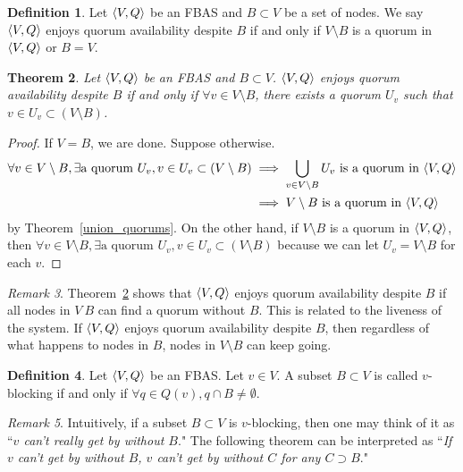 \documentclass[12pt, psamsfonts]{amsart}
\newtheorem{thm}{Theorem}[section]
\theoremstyle{definition}
\newtheorem{defn}[thm]{Definition}
\theoremstyle{remark}
\newtheorem{rem}[thm]{Remark}
\numberwithin{equation}{section}
\begin{document}
\begin{defn}\label{def_quorum_availability}
    Let $\ev{V, Q}$ be an FBAS and $B \subset V$ be a set of nodes.
    We say $\ev{V, Q}$ enjoys quorum availability despite $B$ if and only if $V \setminus B$ is a quorum in $\ev{V, Q}$ or $B = V$.
\end{defn}

\begin{thm}\label{quorum_availability_equivalence_condition}
    Let $\ev{V, Q}$ be an FBAS and $B \subset V$.
    $\ev{V, Q}$ enjoys quorum availability despite $B$ if and only if $\forall v \in V \setminus B$, there exists a quorum $U_v$ such that $v \in U_v \subset (V \setminus B)$.
\end{thm}

\begin{proof}
    If $V = B$, we are done.
    Suppose otherwise.
    \begin{align*}
        \forall v \in V \setminus B, \exists \text{a quorum $U_v$}, v \in U_v \subset (V \setminus B)
            &\implies \bigcup_{v \in V \setminus B} U_v \text{ is a quorum in $\ev{V, Q}$} \\
            &\implies \text{$V \setminus B$ is a quorum in $\ev{V, Q}$}
    \end{align*}
    by Theorem~\ref{union_quorums}.
    On the other hand, if $V \setminus B$ is a quorum in $\ev{V, Q}$, then $\forall v \in V \setminus B, \exists \text{a quorum $U_v$}, v \in U_v \subset (V \setminus B)$ because we can let $U_v = V \setminus B$ for each $v$.
\end{proof}

\begin{rem}
    Theorem~\ref{quorum_availability_equivalence_condition} shows that $\ev{V, Q}$ enjoys quorum availability despite $B$ if all nodes in $V \ B$ can find a quorum without $B$.
    This is related to the liveness of the system.
    If $\ev{V, Q}$ enjoys quorum availability despite $B$, then regardless of what happens to nodes in $B$, nodes in $V \setminus B$ can keep going.
\end{rem}

\begin{defn}\label{def_v_blocking}
    Let $\ev{V, Q}$ be an FBAS\@.
    Let $v \in V$.
    A subset $B \subset V$ is called $v$-blocking if and only if $\forall q \in Q(v), q \cap B \ne \emptyset$.
\end{defn}

\begin{rem}
    Intuitively, if a subset $B \subset V$ is $v$-blocking, then one may think of it as ``\textit{$v$ can't really get by without $B$}."
    The following theorem can be interpreted as ``\textit{If $v$ can't get by without $B$, $v$ can't get by without $C$ for any $C \supset B$}."
\end{rem}
\end{document}
